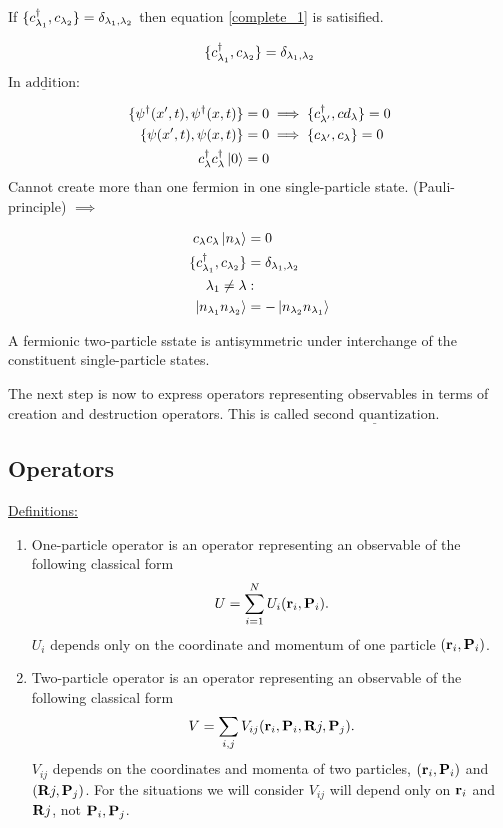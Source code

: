 If $\{c^{\dagger}_{\lambda_1}, c_{\lambda_2}\}= \delta_{\lambda_1, \lambda_2}$ then equation \eqref{complete_1} is satisified.

\begin{equation}
	\{c^{\dagger}_{\lambda_1}, c_{\lambda_2}\}= \delta_{\lambda_1, \lambda_2}
\end{equation}

\noindent $\underline{\text{In addition:}}$

\begin{align}
	\{ \psi^\dagger(x',t), \psi^\dagger(x,t) \} &= 0 \implies \{c^{\dagger}_{\lambda'}, cd_\lambda\} =0\\
	\{ \psi(x',t), \psi(x,t) \} &= 0 \implies \{c_{\lambda'}, c_\lambda\} =0\\
	c^{\dagger}_\lambda c^{\dagger}_\lambda \ket{0}&=0
\end{align}
Cannot create more than one fermion in one single-particle state. (Pauli-principle) $\implies$

\begin{align*}
	c_\lambda c_\lambda \ket{n_\lambda}&=0\\
	\{c^{\dagger}_{\lambda_1},c_{\lambda_2}\}&= \delta_{\lambda_1, \lambda_2}\\
	\lambda_1 \neq \lambda &:\\
	\ket{n_{\lambda_1} n_{\lambda_2}} &= - \ket{n_{\lambda_2} n_{\lambda_1}}
\end{align*}

\noindent A fermionic two-particle sstate is antisymmetric under interchange of the constituent single-particle states.

\begin{tcolorbox}
	The next step is now to express operators representing observables in terms of creation and destruction operators. This is called $\underline{\text{second quantization}}$.
\end{tcolorbox}

\subsection{Operators}

\noindent \uline{Definitions:}

\begin{enumerate}
	\item
		One-particle operator is an operator representing an observable of the following classical form
		\begin{equation}
			U= \sum_{i=1}^{N} U_i(\vb{r}_i, \vb{P}_i).
		\end{equation}
		$U_i$ depends only on the coordinate and momentum of one particle $(\vb{r}_i, \vb{P}_i)$.
	\item
		Two-particle operator is an operator representing an observable of the following classical form
		\begin{equation}
			V= \sum_{i,j } V_{ij} (\vb{r}_i, \vb{P}_i,\vb{R}j, \vb{P}_j).
		\end{equation}
		$V_{ij}$ depends on the coordinates and momenta of two particles, $(\vb{r}_i, \vb{P}_i)$ and $(\vb{R}j, \vb{P}_j)$. For the situations we will consider $V_{ij}$ will depend only on $\vb{r}_i$ and $\vb{R}j$, not $\vb{P}_i, \vb{P}_j$.
\end{enumerate}

